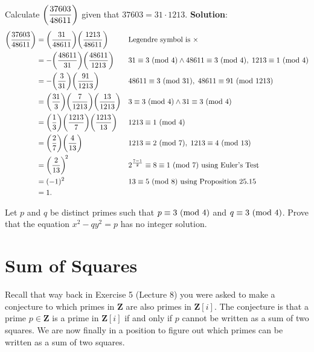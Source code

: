 \begin{Exercise}{}{}
    Calculate $ \biggl(\dfrac{37603}{48611}\biggr) $ given that $ 37603=31\cdot 1213 $.
    \tcblower{}
    \textbf{Solution}:
    \begin{align*}
        \biggl(\dfrac{37603}{48611}\biggr)
         & =\biggl(\dfrac{31}{48611}\biggr)\biggl(\dfrac{1213}{48611}\biggr)            &  & \text{Legendre symbol is $ \times $}                               \\
         & =-\biggl(\dfrac{48611}{31}\biggr)\biggl(\dfrac{48611}{1213}\biggr)           &  & 31\equiv 3\ (\mathrm{mod}\ 4)\land 48611\equiv 3\ (\mathrm{mod}\ 4),\;1213\equiv 1\ (\mathrm{mod}\ 4)  \\
         & =-\biggl(\dfrac{3}{31}\biggr)\biggl(\dfrac{91}{1213}\biggr)                  &  & 48611\equiv 3\ (\mathrm{mod}\ 31),\; 48611\equiv 91\ (\mathrm{mod}\ 1213)                  \\
         & =\biggl(\dfrac{31}{3}\biggr)\biggl(\dfrac{7}{1213}\biggr)\biggl(\dfrac{13}{1213}\biggr) &  & 3\equiv 3\ (\mathrm{mod}\ 4)\land 31\equiv 3\ (\mathrm{mod}\ 4)                            \\
         & =\biggl(\dfrac{1}{3}\biggr)\biggl(\dfrac{1213}{7}\biggr)\biggl(\dfrac{1213}{13}\biggr)  &  & 1213\equiv 1\ (\mathrm{mod}\ 4)                                                \\
         & =\biggl(\dfrac{2}{7}\biggr)\biggl(\dfrac{4}{13}\biggr)                       &  & 1213\equiv 2\ (\mathrm{mod}\ 7),\; 1213\equiv 4\ (\mathrm{mod}\ 13)                        \\
         & =\biggl(\dfrac{2}{13}\biggr)^{\!2}                                &  & 2^{\frac{7-1}{2}}\equiv 8\equiv 1\ (\mathrm{mod}\ 7)\text{ using Euler's Test} \\
         & =(-1)^2                                                &  & 13\equiv 5\ (\mathrm{mod}\ 8)\text{ using Proposition 25.15}                   \\
         & =1.
    \end{align*}
\end{Exercise}
\begin{Example}{}{}
    Let $ p $ and $ q $ be distinct primes such that $ p\equiv 3\ (\mathrm{mod}\ 4) $ and $ q\equiv 3\ (\mathrm{mod}\ 4) $.
    Prove that the equation $ x^2-qy^2=p $ has no integer solution.
\end{Example}

\section{Sum of Squares}
Recall that way back in Exercise 5 (Lecture 8) you were asked to make a conjecture
to which primes in $ \mathbf{Z} $ are also primes in $ \mathbf{Z}[i] $.
The conjecture is that a prime $ p\in\mathbf{Z} $ is a prime in $ \mathbf{Z}[i] $
if and only if $ p $ cannot be written as a sum of two squares.
We are now finally in a position to figure out which primes can be written as a sum
of two squares.

